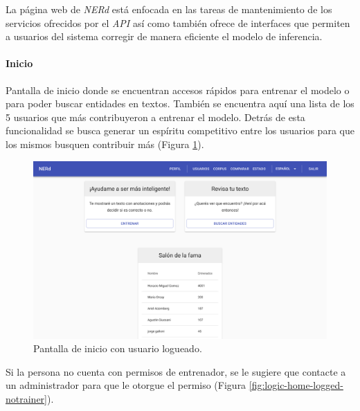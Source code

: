 \documentclass[12pt,a4paper,]{scrartcl}
\let\oldparagraph\paragraph
\renewcommand{\paragraph}[1]{\oldparagraph{#1}\mbox{}}
\begin{document}
La página web de \emph{NERd} está enfocada en las tareas de mantenimiento de los servicios ofrecidos por el \emph{API} así como también ofrece de interfaces que permiten a usuarios del sistema corregir de manera eficiente el modelo de inferencia.

\hypertarget{inicio}{%
\paragraph{Inicio}\label{inicio}}

Pantalla de inicio donde se encuentran accesos rápidos para entrenar el modelo o para poder buscar entidades en textos.
También se encuentra aquí una lista de los 5 usuarios que más contribuyeron a entrenar el modelo. Detrás de esta funcionalidad se busca generar un espíritu competitivo entre los usuarios para que los mismos busquen contribuir más (Figura \ref{fig:logic-home}).

\begin{figure}[H]

{\centering \includegraphics{assets/logic/home-logged-all.pdf} 

}

\caption{Pantalla de inicio con usuario logueado.}\label{fig:logic-home}
\end{figure}

Si la persona no cuenta con permisos de entrenador, se le sugiere que contacte a un administrador para que le otorgue el permiso (Figura \ref{fig:logic-home-logged-notrainer}).
\end{document}
